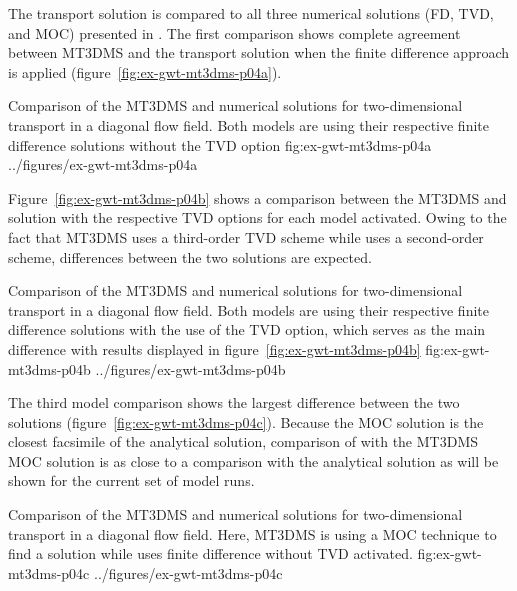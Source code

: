 The \mf transport solution is compared to all three numerical solutions (FD, TVD, and MOC) presented in \cite{zheng1999mt3dms}. The first comparison shows complete agreement between MT3DMS and the \mf transport solution when the finite difference approach is applied (figure~\ref{fig:ex-gwt-mt3dms-p04a}). 

\begin{StandardFigure}
	{Comparison of the MT3DMS and \mf numerical solutions for two-dimensional transport in a diagonal flow field. Both models are using their respective finite difference solutions without the TVD option} 
	{fig:ex-gwt-mt3dms-p04a}
	{../figures/ex-gwt-mt3dms-p04a}
\end{StandardFigure}

Figure~\ref{fig:ex-gwt-mt3dms-p04b} shows a comparison between the MT3DMS and \mf solution with the respective TVD options for each model activated.  Owing to the fact that MT3DMS uses a third-order TVD scheme while \mf uses a second-order scheme, differences between the two solutions are expected. 

\begin{StandardFigure}
	{Comparison of the MT3DMS and \mf numerical solutions for two-dimensional transport in a diagonal flow field. Both models are using their respective finite difference solutions with the use of the TVD option, which serves as the main difference with results displayed in figure~\ref{fig:ex-gwt-mt3dms-p04b}} 
	{fig:ex-gwt-mt3dms-p04b}
	{../figures/ex-gwt-mt3dms-p04b}
\end{StandardFigure}

The third model comparison shows the largest difference between the two solutions (figure~\ref{fig:ex-gwt-mt3dms-p04c}). Because the MOC solution is the closest facsimile of the analytical solution, comparison of \mf with the MT3DMS MOC solution is as close to a comparison with the analytical solution as will be shown for the current set of model runs. 

\begin{StandardFigure}
	{Comparison of the MT3DMS and \mf numerical solutions for two-dimensional transport in a diagonal flow field. Here, MT3DMS is using a MOC technique to find a solution while \mf uses finite difference without TVD activated.} 
	{fig:ex-gwt-mt3dms-p04c}
	{../figures/ex-gwt-mt3dms-p04c}
\end{StandardFigure}



